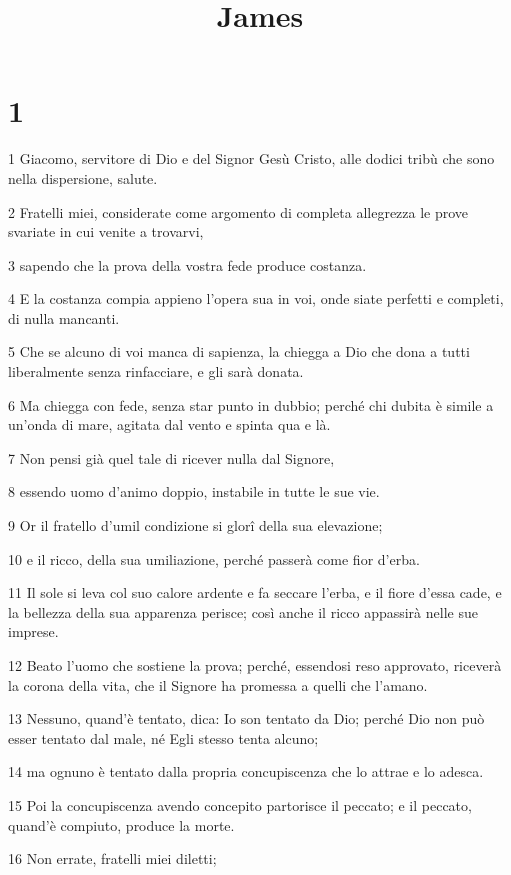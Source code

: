 

\title{James}


\chapter{1}

\par 1 Giacomo, servitore di Dio e del Signor Gesù Cristo, alle dodici tribù che sono nella dispersione, salute.
\par 2 Fratelli miei, considerate come argomento di completa allegrezza le prove svariate in cui venite a trovarvi,
\par 3 sapendo che la prova della vostra fede produce costanza.
\par 4 E la costanza compia appieno l'opera sua in voi, onde siate perfetti e completi, di nulla mancanti.
\par 5 Che se alcuno di voi manca di sapienza, la chiegga a Dio che dona a tutti liberalmente senza rinfacciare, e gli sarà donata.
\par 6 Ma chiegga con fede, senza star punto in dubbio; perché chi dubita è simile a un'onda di mare, agitata dal vento e spinta qua e là.
\par 7 Non pensi già quel tale di ricever nulla dal Signore,
\par 8 essendo uomo d'animo doppio, instabile in tutte le sue vie.
\par 9 Or il fratello d'umil condizione si glorî della sua elevazione;
\par 10 e il ricco, della sua umiliazione, perché passerà come fior d'erba.
\par 11 Il sole si leva col suo calore ardente e fa seccare l'erba, e il fiore d'essa cade, e la bellezza della sua apparenza perisce; così anche il ricco appassirà nelle sue imprese.
\par 12 Beato l'uomo che sostiene la prova; perché, essendosi reso approvato, riceverà la corona della vita, che il Signore ha promessa a quelli che l'amano.
\par 13 Nessuno, quand'è tentato, dica: Io son tentato da Dio; perché Dio non può esser tentato dal male, né Egli stesso tenta alcuno;
\par 14 ma ognuno è tentato dalla propria concupiscenza che lo attrae e lo adesca.
\par 15 Poi la concupiscenza avendo concepito partorisce il peccato; e il peccato, quand'è compiuto, produce la morte.
\par 16 Non errate, fratelli miei diletti;
